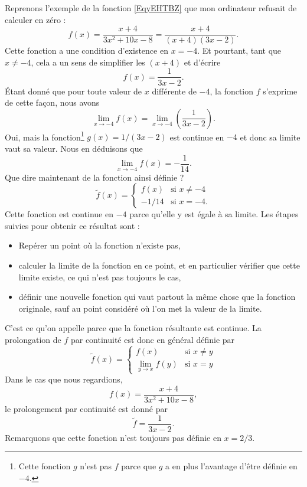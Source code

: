 Reprenons l'exemple de la fonction \eqref{EqyEHTBZ} que mon ordinateur refusait de calculer en zéro :
\begin{equation}
	f(x)=\frac{ x+4 }{ 3x^2+10x-8 }=\frac{ x+4 }{ (x+4)(3x-2) }.
\end{equation}
Cette fonction a une condition d'existence en \( x=-4\). Et pourtant, tant que \( x\neq -4\), cela a un sens de simplifier les \( (x+4)\) et d'écrire
\[
	f(x)=\frac{ 1 }{ 3x-2 }.
\]
Étant donné que pour toute valeur de \( x\) différente de \( -4\), la fonction \( f\) s'exprime de cette façon, nous avons
\[
	\lim_{x\to -4}f(x)=\lim_{x\to -4}\left(\frac{ 1 }{ 3x-2 }\right).
\]
Oui, mais la fonction\footnote{Cette fonction \( g\) n'est pas \( f\) parce que \( g\) a en plus l'avantage d'être définie en \( -4\).} \( g(x)=1/(3x-2)\) est continue en \( -4\) et donc sa limite vaut sa valeur. Nous en déduisons que
\[
	\lim_{x\to -4}f(x)=-\frac{ 1 }{ 14 }.
\]
Que dire maintenant de la fonction ainsi définie ?
\begin{equation}
	\tilde f(x)=
	\begin{cases}
		f(x)  & \text{si }x\neq -4 \\
		-1/14 & \text{si }x=-4.
	\end{cases}
\end{equation}
Cette fonction est continue en \( -4\) parce qu'elle y est égale à sa limite. Les étapes suivies pour obtenir ce résultat sont :
\begin{itemize}
	\item Repérer un point où la fonction n'existe pas,
	\item calculer la limite de la fonction en ce point, et en particulier vérifier que cette limite existe, ce qui n'est pas toujours le cas,
	\item définir une nouvelle fonction qui vaut partout la même chose que la fonction originale, sauf au point considéré où l'on met la valeur de la limite.
\end{itemize}
C'est ce qu'on appelle  parce que la fonction résultante est continue. La prolongation de \( f\) par continuité est donc en général définie par
\begin{equation}
	\tilde f(x)=
	\begin{cases}
		f(x)              & \text{si }x\neq y \\
		\lim_{y\to x}f(y) & \text{si } x=y
	\end{cases}
\end{equation}
Dans le cas que nous regardions,
\[
	f(x)=\frac{ x+4 }{ 3x^2+10x-8 },
\]
le prolongement par continuité est donné par
\begin{equation}
	\tilde f =\frac{ 1 }{ 3x-2 }.
\end{equation}
Remarquons que cette fonction n'est toujours pas définie en \( x=2/3\).

